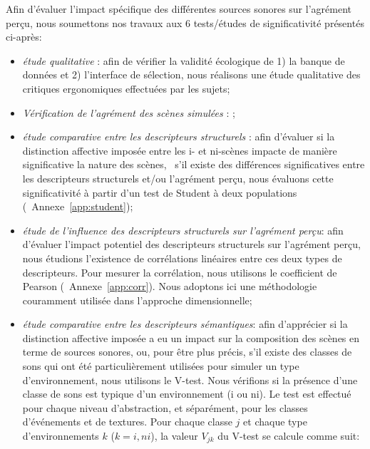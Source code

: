 Afin d'évaluer l'impact spécifique des différentes sources sonores sur l'agrément perçu, nous soumettons nos travaux aux 6 tests/études de significativité présentés ci-après:

\begin{itemize}
\item \emph{étude qualitative} : afin de vérifier la validité écologique de 1) la banque de données et 2) l'interface de sélection, nous réalisons une étude qualitative des critiques ergonomiques effectuées par les sujets;
\item \emph{Vérification de l'agrément des scènes simulées} : ;
\item \emph{étude comparative entre les descripteurs structurels} : afin d'évaluer si la distinction affective imposée entre les i- et ni-scènes impacte de manière significative la nature des scènes, \ie~s'il existe des différences significatives entre les descripteurs structurels et/ou l'agrément perçu, nous évaluons cette significativité à partir d'un test de Student à deux populations (\cf~Annexe~\ref{app:student});
\item \emph{étude de l'influence des descripteurs structurels sur l'agrément perçu}: afin d'évaluer l'impact potentiel des descripteurs structurels sur l'agrément perçu, nous étudions l'existence de corrélations linéaires entre ces deux types de descripteurs. Pour mesurer la corrélation, nous utilisons le coefficient de Pearson (\cf~Annexe~\ref{app:corr}). Nous adoptons ici une méthodologie couramment utilisée dans l'approche dimensionnelle;
\item \emph{étude comparative entre les descripteurs sémantiques}: afin d'apprécier si la distinction affective imposée a eu un impact sur la composition des scènes en terme de sources sonores, ou, pour être plus précis, s'il existe des classes de sons qui ont été particulièrement utilisées pour simuler un type d'environnement, nous utilisons le V-test. Nous vérifions si la présence d'une classe de sons est typique d'un environnement (i ou ni). Le test est effectué pour chaque niveau d'abstraction, et séparément, pour les classes d'événements et de textures. Pour chaque classe $j$ et chaque type d'environnements $k$ ($k={i,ni}$), la valeur $V_{jk}$ du V-test se calcule comme suit: 


\end{itemize}

